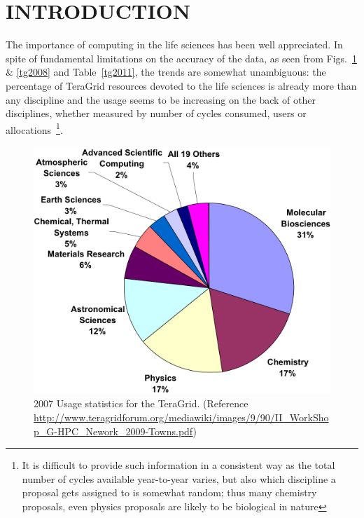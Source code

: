 \documentclass{sig-alternate}
\begin{document}
\section{INTRODUCTION}


The importance of computing in the life sciences has been well
appreciated. %
In spite of fundamental limitations on the accuracy of the data, as
seen from Figs.~\ref{tg2007} \& \ref{tg2008} and Table~\ref{tg2011},
the trends are somewhat unambiguous: the percentage of TeraGrid
resources devoted to the life sciences is already more than any
discipline and the usage seems to be increasing on the back of other
disciplines, whether measured by number of cycles consumed, users or
allocations~\footnote{It is difficult to provide such information in a
  consistent way as the total number of cycles available year-to-year
  varies, but also which discipline a proposal gets assigned to is
  somewhat random; thus many chemistry proposals, even physics
  proposals are likely to be biological in nature}.



\begin{figure}
 \centering
\includegraphics[scale=0.40]{figures/teragrid-discipline07}
\caption{\small 2007 Usage statistics for the TeraGrid.  (Reference
  \url{http://www.teragridforum.org/mediawiki/images/9/90/II_WorkShop_G-HPC_Nework_2009-Towns.pdf})}
  \label{tg2007}
\end{figure}
\end{document}
